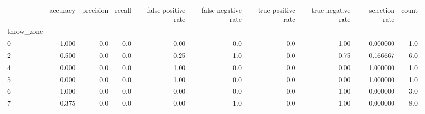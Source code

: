 \begin{tabular}{lrrrrrrrrr}
\toprule
{} &  accuracy &  precision &  recall &  false positive rate &  false negative rate &  true positive rate &  true negative rate &  selection rate &  count \\
throw\_zone &           &            &         &                      &                      &                     &                     &                 &        \\
\midrule
0          &     1.000 &        0.0 &     0.0 &                 0.00 &                  0.0 &                 0.0 &                1.00 &        0.000000 &    1.0 \\
2          &     0.500 &        0.0 &     0.0 &                 0.25 &                  1.0 &                 0.0 &                0.75 &        0.166667 &    6.0 \\
4          &     0.000 &        0.0 &     0.0 &                 1.00 &                  0.0 &                 0.0 &                0.00 &        1.000000 &    1.0 \\
5          &     0.000 &        0.0 &     0.0 &                 1.00 &                  0.0 &                 0.0 &                0.00 &        1.000000 &    1.0 \\
6          &     1.000 &        0.0 &     0.0 &                 0.00 &                  0.0 &                 0.0 &                1.00 &        0.000000 &    3.0 \\
7          &     0.375 &        0.0 &     0.0 &                 0.00 &                  1.0 &                 0.0 &                1.00 &        0.000000 &    8.0 \\
\bottomrule
\end{tabular}
